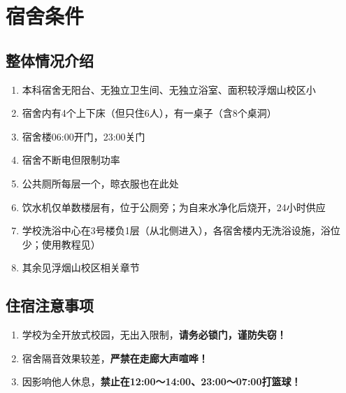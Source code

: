 \section[宿舍条件]{宿舍条件}

\subsection[整体情况介绍]{整体情况介绍}
\begin{enumerate}
    \item 本科宿舍无阳台、无独立卫生间、无独立浴室、面积较浮烟山校区小
    \item 宿舍内有4个上下床（但只住6人），有一桌子（含8个桌洞）
    \item 宿舍楼06:00开门，23:00关门
    \item 宿舍不断电但限制功率\footnotemark
    \item 公共厕所每层一个，晾衣服也在此处
    \item 饮水机仅单数楼层有，位于公厕旁；为自来水净化后烧开，24小时供应
    \item 学校洗浴中心在3号楼负1层（从北侧进入），各宿舍楼内无洗浴设施，浴位少；使用教程见）
    \item 其余见浮烟山校区相关章节
\end{enumerate}

\subsection[住宿注意事项]{住宿注意事项}
\begin{enumerate}
    \item 学校为全开放式校园，无出入限制，\textbf{请务必锁门，谨防失窃！}
    \item 宿舍隔音效果较差，\textbf{严禁在走廊大声喧哗！}
    \item 因影响他人休息，\textbf{禁止在12:00～14:00、23:00～07:00打篮球！}
\end{enumerate}